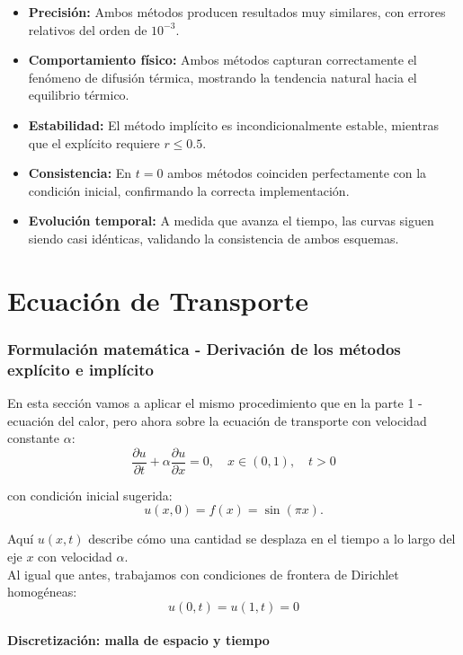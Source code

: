 \documentclass[12pt,a4paper]{article}
\begin{document}
\begin{itemize}
    \item \textbf{Precisión:} Ambos métodos producen resultados muy similares, con errores relativos del orden de $10^{-3}$.
    \item \textbf{Comportamiento físico:} Ambos métodos capturan correctamente el fenómeno de difusión térmica, mostrando la tendencia natural hacia el equilibrio térmico.
    \item \textbf{Estabilidad:} El método implícito es incondicionalmente estable, mientras que el explícito requiere $r \leq 0.5$.
    \item \textbf{Consistencia:} En $t=0$ ambos métodos coinciden perfectamente con la condición inicial, confirmando la correcta implementación.
    \item \textbf{Evolución temporal:} A medida que avanza el tiempo, las curvas siguen siendo casi idénticas, validando la consistencia de ambos esquemas.
\end{itemize}

\part{Ecuación de Transporte}

\section{Formulación matemática - Derivación de los métodos explícito e implícito}

En esta sección vamos a aplicar el mismo procedimiento que en la parte 1 - ecuación del calor, pero ahora sobre la ecuación de transporte con velocidad constante $\alpha$:
\[
\frac{\partial u}{\partial t} + \alpha \frac{\partial u}{\partial x} = 0,
\quad x \in (0,1), \quad t > 0
\]

con condición inicial sugerida:
\[
u(x,0) = f(x) = \sin(\pi x).
\]

Aquí $u(x,t)$ describe cómo una cantidad se desplaza en el tiempo a lo largo del eje $x$ con velocidad $\alpha$. \\

Al igual que antes, trabajamos con condiciones de frontera de Dirichlet homogéneas:
\[
u(0,t)=u(1,t)=0
\]

\subsection{Discretización: malla de espacio y tiempo}
\end{document}
